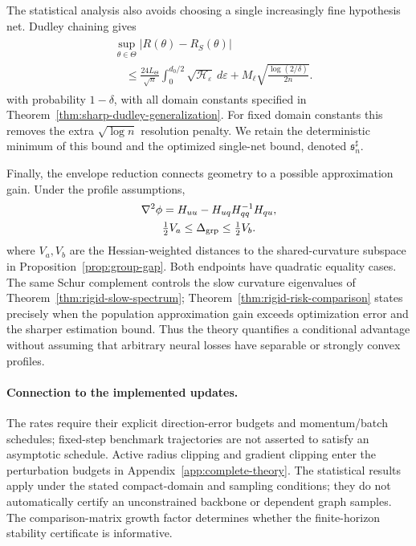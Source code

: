 The statistical analysis also avoids choosing a single increasingly fine hypothesis net. Dudley chaining \citep{dudley1967sizes,bartlett2002rademacher} gives
\begin{gather}
 \begin{aligned}
 &\sup_{\theta\in\Theta}|R(\theta)-R_S(\theta)|\\
 &\quad\le\frac{24L_\Theta}{\sqrt n}\int_0^{d_0/2}\sqrt{\mathcal H_\varepsilon}\,d\varepsilon
 +M_\ell\sqrt{\frac{\log(2/\delta)}{2n}}.
 \end{aligned}
\end{gather}
with probability $1-\delta$, with all domain constants specified in Theorem~\ref{thm:sharp-dudley-generalization}. For fixed domain constants this removes the extra $\sqrt{\log n}$ resolution penalty. We retain the deterministic minimum of this bound and the optimized single-net bound, denoted $\mathfrak s_n^\sharp$.

Finally, the envelope reduction \citep{milgrom2002envelope} connects geometry to a possible approximation gain. Under the profile assumptions,
\begin{gather}
 \nabla^2\phi=H_{uu}-H_{uq}H_{qq}^{-1}H_{qu},\\
 \tfrac12V_a\le\Delta_{\rm grp}\le\tfrac12V_b.
\end{gather}
where $V_a,V_b$ are the Hessian-weighted distances to the shared-curvature subspace in Proposition~\ref{prop:group-gap}. Both endpoints have quadratic equality cases. The same Schur complement controls the slow curvature eigenvalues of Theorem~\ref{thm:rigid-slow-spectrum}; Theorem~\ref{thm:rigid-risk-comparison} states precisely when the population approximation gain exceeds optimization error and the sharper estimation bound. Thus the theory quantifies a conditional advantage without assuming that arbitrary neural losses have separable or strongly convex profiles.

\paragraph{Connection to the implemented updates.}
The rates require their explicit direction-error budgets and momentum/batch schedules; fixed-step benchmark trajectories are not asserted to satisfy an asymptotic schedule. Active radius clipping and gradient clipping enter the perturbation budgets in Appendix~\ref{app:complete-theory}. The statistical results apply under the stated compact-domain and sampling conditions; they do not automatically certify an unconstrained backbone or dependent graph samples. The comparison-matrix growth factor determines whether the finite-horizon stability certificate is informative.
